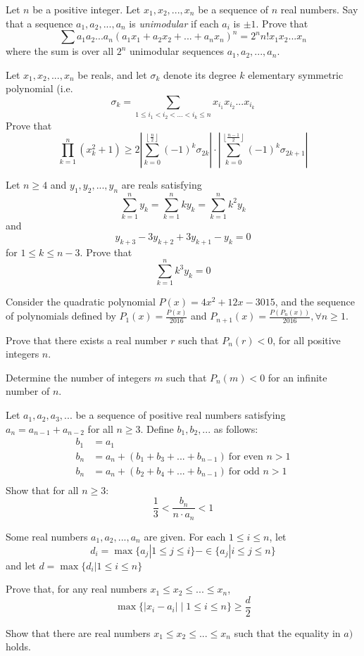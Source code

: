  {Let $n$ be a positive integer. Let $x_1, x_2,..., x_n$ be a sequence of $n$ real numbers. Say that a sequence $a_1, a_2,..., a_n$ is
\textit{unimodular} if each $a_i$ is $\pm 1$. Prove that $$\sum a_1a_2...a_n(a_1x_1+a_2x_2+...+a_nx_n)^n= 2^nn!x_1x_2...x_n$$ where the sum is over all $2^n$ unimodular sequences $a_1,a_2,...,a_n$.}

 {Let $x_1,x_2,...,x_n$ be reals, and let $\sigma_k$ denote its degree $k$ elementary symmetric polynomial (i.e. $$\sigma_k=\sum_{1\le i_1<i_2<...<i_k\le n} x_{i_1}x_{i_2}...x_{i_k}$$
Prove that $$\prod_{k=1}^n (x_k^2+1) \ge 2\left\lvert \sum_{k=0}^{\left\lfloor \frac{n}{2}\right\rfloor} (-1)^k\sigma_{2k} \right\rvert\cdot \left\lvert \sum_{k=0}^{\left\lfloor \frac{n-1}{2}\right\rfloor} (-1)^k\sigma_{2k+1} \right\rvert$$}



 {Let $n\ge 4$ and $y_1,y_2,...,y_n$ are reals satisfying $$\sum_{k=1}^n y_k=\sum_{k=1}^n ky_k = \sum_{k=1}^n k^2y_k$$ and $$y_{k+3}-3y_{k+2}+3y_{k+1}-y_k=0$$ for $1\le k\le n-3$. Prove that $$\sum_{k=1}^n k^3y_k=0$$}

 {Consider the quadratic polynomial $P(x) = 4x^2 + 12x - 3015$, and the sequence of polynomials defined by $P_1(x) = \frac{P(x)}{2016}$ and $P_{n+1}(x) = \frac{P(P_n(x))}{2016}, \forall n \ge 1$.
\bi
    \item[a)] Prove that there exists a real number $r$ such that $P_n(r) < 0$, for all positive integers $n$.
    \item[b)] Determine the number of integers $m$ such that $P_n(m) < 0$ for an infinite number of $n$.
\ei}

 {Let $a_1,a_2,a_3,...$ be a sequence of positive real numbers satisfying $a_n=a_{n-1}+a_{n-2}$ for all $n\ge 3$. Define $b_1,b_2,...$ as follows:
    \begin{align*}
    b_1 &= a_1\\
    b_n &= a_n + (b_1+b_3+...+b_{n-1})\ \text{for even }n>1\\
    b_n &= a_n + (b_2+b_4+...+b_{n-1})\ \text{for odd }n>1\\
    \end{align*}
    Show that for all $n\ge 3$: 
    $$\frac{1}{3}<\frac{b_n}{n\cdot a_n}<1$$}



 {Some real numbers $a_1, a_2,..., a_n$ are given. For each $1 \le i \le n$, let
\[d_i = \max\{a_j | 1 \le j \le i \} - \in\{a_j | i \le j \le n \}\]
and let $d = \max\{d_i | 1 \le i \le n \}$
\bi
    \item[a)] Prove that, for any real numbers $x_1 \le x_2 \le ... \le x_n$,
    \[\max\{|x_i-a_i|\mid1\le i \le n\} \ge \frac d2\]
    \item[b)] Show that there are real numbers $x_1 \le x_2 \le ... \le x_n$ such that the equality in $a)$ holds.
\ei}


